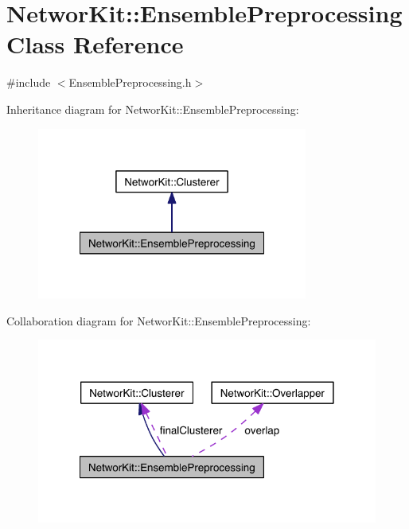 \hypertarget{class_networ_kit_1_1_ensemble_preprocessing}{\section{Networ\-Kit\-:\-:Ensemble\-Preprocessing Class Reference}
\label{class_networ_kit_1_1_ensemble_preprocessing}
}


{\ttfamily \#include $<$Ensemble\-Preprocessing.\-h$>$}



Inheritance diagram for Networ\-Kit\-:\-:Ensemble\-Preprocessing\-:\nopagebreak
\begin{figure}[H]
\begin{center}
\leavevmode
\includegraphics[width=252pt]{class_networ_kit_1_1_ensemble_preprocessing__inherit__graph}
\end{center}
\end{figure}


Collaboration diagram for Networ\-Kit\-:\-:Ensemble\-Preprocessing\-:\nopagebreak
\begin{figure}[H]
\begin{center}
\leavevmode
\includegraphics[width=318pt]{class_networ_kit_1_1_ensemble_preprocessing__coll__graph}
\end{center}
\end{figure}
